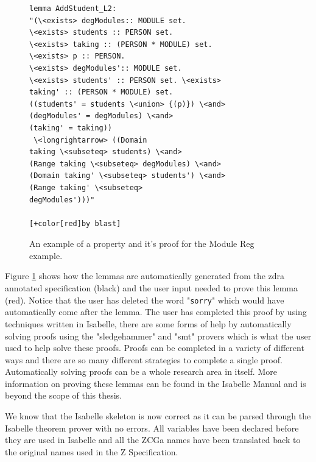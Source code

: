 \begin{figure}[H]
\begin{minipage}{0.45\textwidth}
\begin{scriptsize}
\begin{BVerbatim}[commandchars=+\[\]]
lemma AddStudent_L2: 
"(\<exists> degModules:: MODULE set. 
\<exists> students :: PERSON set. 
\<exists> taking :: (PERSON * MODULE) set. 
\<exists> p :: PERSON.
\<exists> degModules':: MODULE set. 
\<exists> students' :: PERSON set. \<exists>
taking' :: (PERSON * MODULE) set. 
((students' = students \<union> {(p)}) \<and>
(degModules' = degModules) \<and> 
(taking' = taking))
 \<longrightarrow> ((Domain
taking \<subseteq> students) \<and> 
(Range taking \<subseteq> degModules) \<and>
(Domain taking' \<subseteq> students') \<and> 
(Range taking' \<subseteq>
degModules')))"

[+color[red]by blast]
\end{BVerbatim}
\end{scriptsize}
\end{minipage}
\caption{An example of a property and it's proof for the Module Reg example. \label{fig:propertyproof}}
\end{figure}

Figure \ref{fig:propertyproof} shows how the lemmas are automatically generated from
the \gls{zdra} annotated specification (black) and the user input needed to
prove this lemma (red). Notice that the user has deleted the word
"\texttt{sorry}" which would have automatically come after the lemma.
The user has completed this proof by using techniques written in Isabelle, there are some forms of 
help by automatically solving proofs using the "sledgehammer" and "smt" provers which is what the 
user used to help solve these proofs.
Proofs can be completed in a variety of different ways and there are so many different strategies 
to complete a single proof. Automatically solving proofs can be a whole research area in itself.
More information on proving these lemmas can be found in the Isabelle Manual
\cite{isabelle} and is beyond the scope of this thesis.

We know that the Isabelle skeleton is now correct as it can be parsed through the 
Isabelle theorem prover with no errors.
All variables have been declared before they are used in Isabelle and all the ZCGa names
have been translated back to the original names used in the Z Specification.


